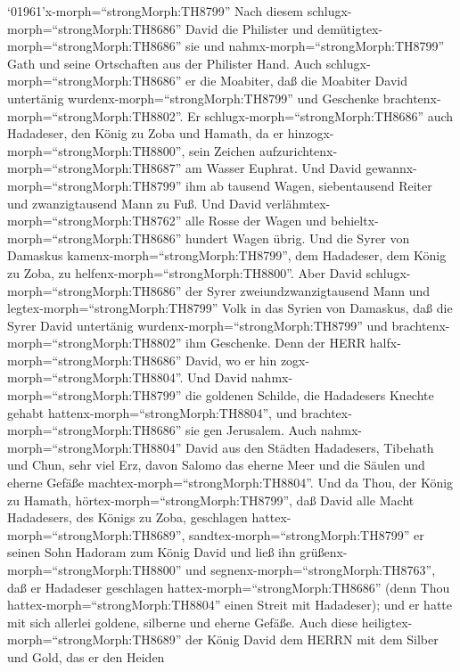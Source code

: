  `01961'\textbar x-morph=``strongMorph:TH8799'' Nach diesem
schlugx-morph=``strongMorph:TH8686'' David die Philister und
demütigtex-morph=``strongMorph:TH8686'' sie und
nahmx-morph=``strongMorph:TH8799'' Gath und seine Ortschaften aus der
Philister Hand.  Auch schlugx-morph=``strongMorph:TH8686''
er die Moabiter, daß die Moabiter David untertänig
wurdenx-morph=``strongMorph:TH8799'' und Geschenke
brachtenx-morph=``strongMorph:TH8802''.  Er
schlugx-morph=``strongMorph:TH8686'' auch Hadadeser, den König zu Zoba
und Hamath, da er hinzogx-morph=``strongMorph:TH8800'', sein Zeichen
aufzurichtenx-morph=``strongMorph:TH8687'' am Wasser Euphrat.
 Und David gewannx-morph=``strongMorph:TH8799'' ihm ab
tausend Wagen, siebentausend Reiter und zwanzigtausend Mann zu Fuß. Und
David verlähmtex-morph=``strongMorph:TH8762'' alle Rosse der Wagen und
behieltx-morph=``strongMorph:TH8686'' hundert Wagen übrig. 
Und die Syrer von Damaskus kamenx-morph=``strongMorph:TH8799'', dem
Hadadeser, dem König zu Zoba, zu helfenx-morph=``strongMorph:TH8800''.
Aber David schlugx-morph=``strongMorph:TH8686'' der Syrer
zweiundzwanzigtausend Mann  und
legtex-morph=``strongMorph:TH8799'' Volk in das Syrien von Damaskus, daß
die Syrer David untertänig wurdenx-morph=``strongMorph:TH8799'' und
brachtenx-morph=``strongMorph:TH8802'' ihm Geschenke. Denn der HERR
halfx-morph=``strongMorph:TH8686'' David, wo er hin
zogx-morph=``strongMorph:TH8804''.  Und David
nahmx-morph=``strongMorph:TH8799'' die goldenen Schilde, die Hadadesers
Knechte gehabt hattenx-morph=``strongMorph:TH8804'', und
brachtex-morph=``strongMorph:TH8686'' sie gen Jerusalem. 
Auch nahmx-morph=``strongMorph:TH8804'' David aus den Städten
Hadadesers, Tibehath und Chun, sehr viel Erz, davon Salomo das eherne
Meer und die Säulen und eherne Gefäße
machtex-morph=``strongMorph:TH8804''.  Und da Thou, der
König zu Hamath, hörtex-morph=``strongMorph:TH8799'', daß David alle
Macht Hadadesers, des Königs zu Zoba, geschlagen
hattex-morph=``strongMorph:TH8689'', 
sandtex-morph=``strongMorph:TH8799'' er seinen Sohn Hadoram zum König
David und ließ ihn grüßenx-morph=``strongMorph:TH8800'' und
segnenx-morph=``strongMorph:TH8763'', daß er Hadadeser geschlagen
hattex-morph=``strongMorph:TH8686'' (denn Thou
hattex-morph=``strongMorph:TH8804'' einen Streit mit Hadadeser); und er
hatte mit sich allerlei goldene, silberne und eherne Gefäße.
 Auch diese heiligtex-morph=``strongMorph:TH8689'' der
König David dem HERRN mit dem Silber und Gold, das er den Heiden
